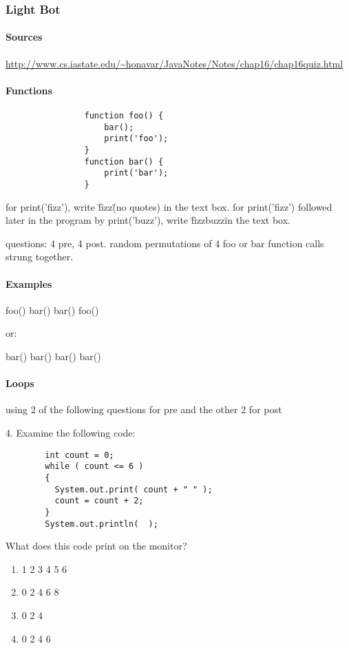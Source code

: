 	\subsubsection{Light Bot}
		\paragraph{Sources} \url{http://www.cs.iastate.edu/~honavar/JavaNotes/Notes/chap16/chap16quiz.html}
		\paragraph{Functions}
			\begin{lstlisting}
				function foo() {
					bar();
					print('foo');
				}
				function bar() {
					print('bar');
				}
			\end{lstlisting}

for print('fizz'), write \"fizz\" (no quotes) in the text box. for print('fizz') followed later in the program by print('buzz'), write \"fizzbuzz\" in the text box.

questions: 4 pre, 4 post. random permutations of 4 foo or bar function calls strung together.

		\paragraph{Examples}

foo()
bar()
bar()
foo()

or:

bar()
bar()
bar()
bar()

		\paragraph{Loops} using 2 of the following questions for pre and the other 2 for post

4. Examine the following code:
	\begin{lstlisting}
		int count = 0;                                  
		while ( count <= 6 )  
		{
		  System.out.print( count + " " );
		  count = count + 2; 
		}
		System.out.println(  );
	\end{lstlisting}
What does this code print on the monitor?
\begin{enumerate}
	\item 1 2 3 4 5 6
	\item 0 2 4 6 8
	\item 0 2 4
	\item 0 2 4 6
\end{enumerate}

